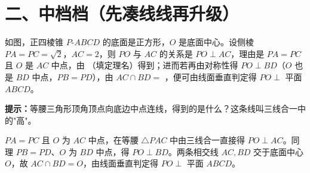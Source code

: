 \documentclass{exam-zh}
\begin{document}
\section*{二、中档档（先凑线线再升级）}


\begin{question}[points=5]
  \noindent
  \begin{minipage}[t]{\dimexpr\linewidth-60mm-6mm\relax}
    \vspace{0pt}
    如图，正四棱锥 $P\text{-}ABCD$ 的底面是正方形，$O$ 是底面中心。设侧棱 $PA=PC=\sqrt{2}$，$AC=2$，则 $PO$ 与 $AC$ 的关系是 $PO\perp AC$，理由是 $PA=PC$ 且 $O$ 是 $AC$ 中点，由 \underline{\quad\quad\quad\quad\quad\quad}（填定理名）得到；进而若再由对称性得 $PO\perp BD$（$O$ 也是 $BD$ 中点，$PB=PD$），由 $AC\cap BD=$ \underline{\quad}，便可由线面垂直判定得 $PO\perp$ 平面 $ABCD$。
    \begin{hintbox}
\textbf{提示：}等腰三角形顶角顶点向底边中点连线，得到的是什么？这条线叫三线合一中的"高"。\end{hintbox}

  \end{minipage}\hfill
  \begin{diagramcoltikz}{60mm}{正四棱锥，O 为底面中心，观察 PO 与两条对角线的关系。}
  }
  \end{diagramcoltikz}
  \begin{solutionblock}
    $PA=PC$ 且 $O$ 为 $AC$ 中点，在等腰 $\triangle PAC$ 中由三线合一直接得 $PO\perp AC$。同理 $PB=PD$、$O$ 为 $BD$ 中点，得 $PO\perp BD$。两条相交线 $AC,BD$ 交于底面中心 $O$，故 $AC\cap BD=O$，由线面垂直判定得 $PO\perp$ 平面 $ABCD$。
  \end{solutionblock}
\end{question}



\end{document}
